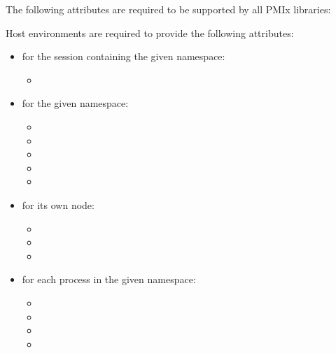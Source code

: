 \reqattrstart
The following attributes are required to be supported by all \ac{PMIx} libraries:


\divider

Host environments are required to provide the following attributes:

\begin{itemize}
    \item for the session containing the given namespace:
        \begin{itemize}
            \item {}
        \end{itemize}
    \item for the given namespace:
        \begin{itemize}
            \item {}
            \item {}
            \item {}
            \item {}
            \item {}
        \end{itemize}
    \item for its own node:
        \begin{itemize}
            \item {}
            \item {}
            \item {}
        \end{itemize}
    \item for each process in the given namespace:
        \begin{itemize}
            \item {}
            \item {}
            \item {}
            \item {}
        \end{itemize}
\end{itemize}


